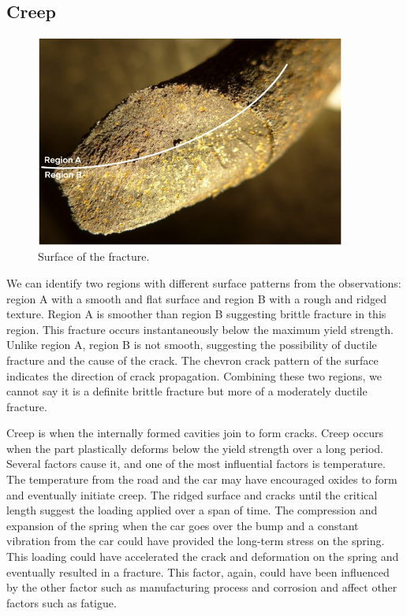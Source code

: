 \documentclass[11pt]{article}
\begin{document}
\subsection{Creep}
\begin{figure}[H]
    \centering
    \includegraphics[height = 7cm]{./img/creep1.png}
    \caption{Surface of the fracture.}
    \label{fig:creep1}
\end{figure}
We can identify two regions with different surface patterns from the observations: region A with a smooth and flat surface and region B with a rough and ridged texture. Region A is smoother than region B suggesting brittle fracture in this region. This fracture occurs instantaneously below the maximum yield strength. Unlike region A, region B is not smooth, suggesting the possibility of ductile fracture and the cause of the crack. The chevron crack pattern of the surface indicates the direction of crack propagation. Combining these two regions, we cannot say it is a definite brittle fracture but more of a moderately ductile fracture. 

Creep is when the internally formed cavities join to form cracks. Creep occurs when the part plastically deforms below the yield strength over a long period. Several factors cause it, and one of the most influential factors is temperature. The temperature from the road and the car may have encouraged oxides to form and eventually initiate creep. The ridged surface and cracks until the critical length suggest the loading applied over a span of time. The compression and expansion of the spring when the car goes over the bump and a constant vibration from the car could have provided the long-term stress on the spring. This loading could have accelerated the crack and deformation on the spring and eventually resulted in a fracture. This factor, again, could have been influenced by the other factor such as manufacturing process and corrosion and affect other factors such as fatigue. 
 
\end{document}
